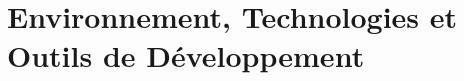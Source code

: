 \chapter{Environnement, Technologies et Outils de Développement}
\label{ch:environnement-technologies}

